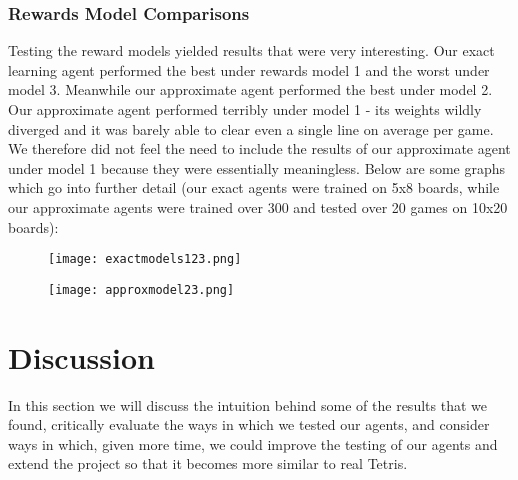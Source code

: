 \documentclass[10pt]{article}
\begin{document}
\subsubsection{Rewards Model Comparisons}
Testing the reward models yielded results that were very interesting. Our exact learning agent performed the best under rewards model 1 and the worst under model 3. Meanwhile our approximate agent performed the best under model 2. Our approximate agent performed terribly under model 1 - its weights wildly diverged and it was barely able to clear even a single line on average per game. We therefore did not feel the need to include the results of our approximate agent under model 1 because they were essentially meaningless. Below are some graphs which go into further detail (our exact agents were trained on 5x8 boards, while our approximate agents were trained over 300 and tested over 20 games on 10x20 boards):
\begin{figure}[H]
  \centering
  \begin{minipage}[b]{0.4\textwidth}
    \texttt{[image: exactmodels123.png]}
  \end{minipage}
  \hfill
  \begin{minipage}[b]{0.4\textwidth}
    \texttt{[image: approxmodel23.png]}
  \end{minipage}
\end{figure}

\section{Discussion}
In this section we will discuss the intuition behind some of the results that we found, critically evaluate the ways in which we tested our agents, and consider ways in which, given more time, we could improve the testing of our agents and extend the project so that it becomes more similar to real Tetris.

\bigskip
\end{document}
